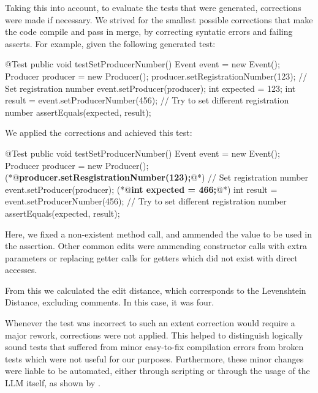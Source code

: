 Taking this into account, to evaluate the tests that were generated, corrections were made if necessary. We strived for the smallest possible corrections that make the code compile and pass in merge, by correcting syntatic errors and failing asserts.
For example, given the following generated test:
\begin{response}
@Test
public void testSetProducerNumber() {
    Event event = new Event();
    Producer producer = new Producer();
    producer.setRegistrationNumber(123); // Set registration number
    event.setProducer(producer);
    int expected = 123;
    int result = event.setProducerNumber(456); // Try to set different registration number
    assertEquals(expected, result);
}
\end{response}
We applied the corrections and achieved this test:
\begin{response}
@Test
public void testSetProducerNumber() {
    Event event = new Event();
    Producer producer = new Producer();
    (*@\textbf{producer.setResgistrationNumber(123);}@*) // Set registration number
    event.setProducer(producer);
    (*@\textbf{int expected = 466;}@*)
    int result = event.setProducerNumber(456); // Try to set different registration number
    assertEquals(expected, result);
}
\end{response}
Here, we fixed a non-existent method call, and ammended the value to be used in the assertion.
Other common edits were ammending constructor calls with extra parameters or replacing getter calls for getters which did not exist with direct accesses.

From this we calculated the edit distance, which corresponds to the Levenshtein Distance, excluding comments.
In this case, it was four.

Whenever the test was incorrect to such an extent correction would require a major rework, corrections were not applied. This helped to distinguish logically sound tests
that suffered from minor easy-to-fix compilation errors from broken tests which were not useful for our purposes. Furthermore, these minor changes were liable to be automated,
either through scripting or through the usage of the LLM itself, as shown by .

